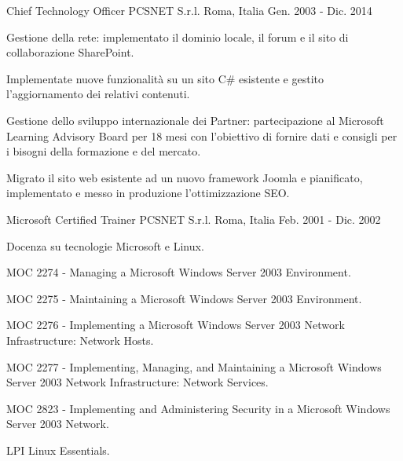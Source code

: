 \begin{cventries}
  \cventry
    {Chief Technology Officer} %
    {PCSNET S.r.l.} %
    {Roma, Italia} %
    {Gen. 2003 - Dic. 2014} %
    {
      \begin{cvitems} %
        \item {Gestione della rete: implementato il dominio locale, il forum e il sito di collaborazione SharePoint.}
        \item {Implementate nuove funzionalità su un sito C\# esistente e gestito l'aggiornamento dei relativi contenuti.}
        \item {Gestione dello sviluppo internazionale dei Partner: partecipazione al Microsoft Learning Advisory Board per 18 mesi con l'obiettivo di fornire dati e consigli per i bisogni della formazione e del mercato.}
        \item {Migrato il sito web esistente ad un nuovo framework Joomla e pianificato, implementato e messo in produzione l'ottimizzazione SEO.}
      \end{cvitems}
    }

  \cventry
    {Microsoft Certified Trainer} %
    {PCSNET S.r.l.} %
    {Roma, Italia} %
    {Feb. 2001 - Dic. 2002} %
    {
      \begin{cvitems} %
        \item {Docenza su tecnologie Microsoft e Linux.}
        \item {MOC 2274 - Managing a Microsoft Windows Server 2003 Environment.}
        \item {MOC 2275 - Maintaining a Microsoft Windows Server 2003 Environment.}
        \item {MOC 2276 - Implementing a Microsoft Windows Server 2003 Network Infrastructure: Network Hosts.}
        \item {MOC 2277 - Implementing, Managing, and Maintaining a Microsoft Windows Server 2003 Network Infrastructure: Network Services.}
        \item {MOC 2823 - Implementing and Administering Security in a Microsoft Windows Server 2003 Network.}
        \item {LPI Linux Essentials.}
      \end{cvitems}
    }

\end{cventries}
